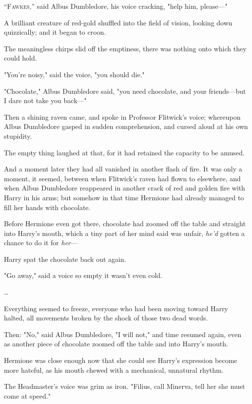 
\lettrine{“F}{awkes},'' said
Albus Dumbledore, his voice cracking, "help him, please---"

A brilliant creature of red-gold shuffled into the field of vision, looking
down quizzically; and it began to croon.

The meaningless chirps slid off the emptiness, there was nothing onto which
they could hold.

"You're noisy," said the voice, "you should die."

"Chocolate," Albus Dumbledore said, "you need chocolate, and your friends---but
I dare not take you back---"

Then a shining raven came, and spoke in Professor Flitwick's voice; whereupon
Albus Dumbledore gasped in sudden comprehension, and cursed aloud at his own
stupidity.

The empty thing laughed at that, for it had retained the capacity to be amused.

And a moment later they had all vanished in another flash of fire.
\sbreak
It was only a moment, it seemed, between when Flitwick's raven had flown to
elsewhere, and when Albus Dumbledore reappeared in another crack of red and
golden fire with Harry in his arms; but somehow in that time Hermione had
already managed to fill her hands with chocolate.

Before Hermione even got there, chocolate had zoomed off the table and straight
into Harry's mouth, which a tiny part of her mind said was unfair, \emph{he'd}
gotten a chance to do it for \emph{her---}

Harry spat the chocolate back out again.

"Go away," said a voice so empty it wasn't even cold.

{\ldots}

Everything seemed to freeze, everyone who had been moving toward Harry halted,
all movements broken by the shock of those two dead words.

Then: "No," said Albus Dumbledore, "I will not," and time resumed again, even
as another piece of chocolate zoomed off the table and into Harry's mouth.

Hermione was close enough now that she could see Harry's expression become more
hateful, as his mouth chewed with a mechanical, unnatural rhythm.

The Headmaster's voice was grim as iron. "Filius, call Minerva, tell her she
must come at speed."

